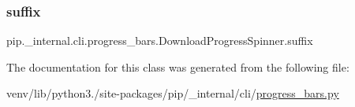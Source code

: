 \subsubsection{\texorpdfstring{suffix}{suffix}}
{\footnotesize\ttfamily pip.\+\_\+internal.\+cli.\+progress\+\_\+bars.\+Download\+Progress\+Spinner.\+suffix\hspace{0.3cm}{\ttfamily [static]}}



The documentation for this class was generated from the following file\+:\begin{DoxyCompactItemize}
\item 
venv/lib/python3./site-\/packages/pip/\+\_\+internal/cli/\hyperlink{progress__bars_8py}{progress\+\_\+bars.\+py}\end{DoxyCompactItemize}
